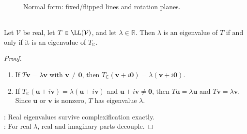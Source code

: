 \begin{figure}[H]
  \centering
  
  \caption{Normal form: fixed/flipped lines and rotation planes.}
  \label{fig:real-isometry-blocks}
\end{figure}

\begin{proposition} \label{prop:real-eigenvalues-complexification} \\
Let $\mathcal{V}$ be real, let $T\in\LL(\mathcal{V})$, and let $\lambda\in\mathbb{R}$. Then $\lambda$ is an eigenvalue of $T$ if and only if it is an eigenvalue of $T_{\mathbb{C}}$.
\begin{proof}
\begin{enumerate}[label=\roman*.]
\setlength{\itemsep}{0pt}
\item[$(\Rightarrow)$] If $T\mathbf{v}=\lambda\mathbf{v}$ with $\mathbf{v}\neq\mathbf{0}$, then $T_{\mathbb{C}}(\mathbf{v}+i\mathbf{0})=\lambda(\mathbf{v}+i\mathbf{0})$.
\item[$(\Leftarrow)$] If $T_{\mathbb{C}}(\mathbf{u}+i\mathbf{v})=\lambda(\mathbf{u}+i\mathbf{v})$ and $\mathbf{u}+i\mathbf{v}\neq\mathbf{0}$, then $T\mathbf{u}=\lambda\mathbf{u}$ and $T\mathbf{v}=\lambda\mathbf{v}$.\\
Since $\mathbf{u}$ or $\mathbf{v}$ is nonzero, $T$ has eigenvalue $\lambda$.
\end{enumerate}
: Real eigenvalues survive complexification exactly.\\
: For real $\lambda$, real and imaginary parts decouple.
\end{proof}
\end{proposition}

